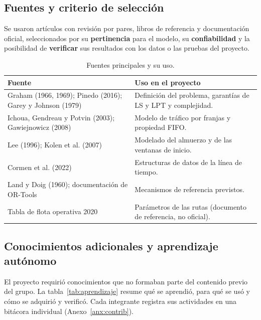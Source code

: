\subsection{Fuentes y criterio de selección}
Se usaron artículos con revisión por pares, libros de referencia y documentación oficial, seleccionados por su \textbf{pertinencia} para el modelo, su \textbf{confiabilidad} y la posibilidad de \textbf{verificar} sus resultados con los datos o las pruebas del proyecto.

\begin{table}[H]
\centering\small
\caption{Fuentes principales y su uso.}
\begin{tabularx}{\textwidth}{L{6.4cm}Y}
\toprule
Fuente & Uso en el proyecto \\
\midrule
Graham (1966, 1969); Pinedo (2016); Garey y Johnson (1979) & Definición del problema, garantías de LS y LPT y complejidad. \\
Ichoua, Gendreau y Potvin (2003); Gawiejnowicz (2008) & Modelo de tráfico por franjas y propiedad FIFO. \\
Lee (1996); Kolen et al. (2007) & Modelado del almuerzo y de las ventanas de inicio. \\
Cormen et al. (2022) & Estructuras de datos de la línea de tiempo. \\
Land y Doig (1960); documentación de OR-Tools & Mecanismos de referencia previstos. \\
Tabla de flota operativa 2020 & Parámetros de las rutas (documento de referencia, no oficial). \\
\bottomrule
\end{tabularx}
\end{table}

\subsection{Conocimientos adicionales y aprendizaje autónomo}
El proyecto requirió conocimientos que no formaban parte del contenido previo del grupo. La tabla~\ref{tab:aprendizaje} resume qué se aprendió, para qué se usó y cómo se adquirió y verificó. Cada integrante registra sus actividades en una bitácora individual (Anexo~\ref{anx:contrib}).

